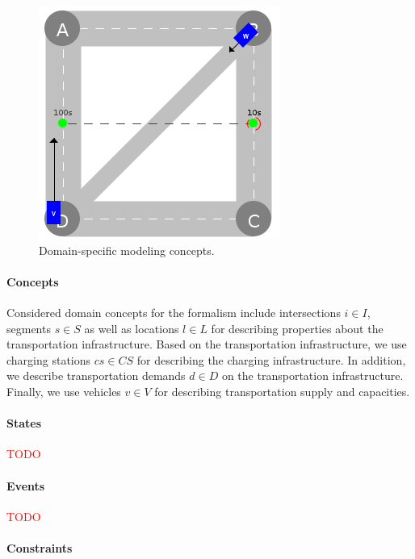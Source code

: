 \documentclass[10pt,twocolumn]{article}
\begin{document}
\begin{figure}[!ht]
	\centering
	\includegraphics[width=0.6\columnwidth]{../../events/demand.png}
	\caption{Domain-specific modeling concepts.}
	\label{fig:domain-specific-modeling}
\end{figure}

\paragraph{Concepts}

Considered domain concepts for the formalism include intersections $i \in I$, segments $s \in S$ as well as locations $l \in L$ for describing properties about the transportation infrastructure.
Based on the transportation infrastructure, we use charging stations $cs \in CS$ for describing the charging infrastructure. In addition, we describe transportation demands $d \in D$ on the transportation infrastructure.
Finally, we use vehicles $v \in V$ for describing transportation supply and capacities.

\paragraph{States}

\textcolor{red}{TODO}

\paragraph{Events}

\textcolor{red}{TODO}

\paragraph{Constraints}
\end{document}
